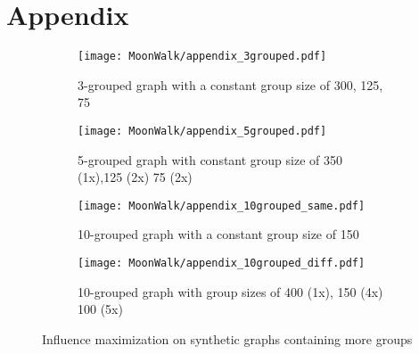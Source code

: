 \section{Appendix}

\begin{figure}[H]
  \begin{subfigure}[H]{0.475\textwidth}
    \texttt{[image: MoonWalk/appendix\_3grouped.pdf]}
    \caption{3-grouped graph with a constant group size of 300, 125, 75}
    \label{fig:7a}
  \end{subfigure}\hfill
  \begin{subfigure}[H]{0.475\textwidth}
    \texttt{[image: MoonWalk/appendix\_5grouped.pdf]}
    \caption{5-grouped graph with constant group size of 350 (1x),125 (2x) 75 (2x)}
    \label{fig:7b}
  \end{subfigure}\hfill
  \begin{subfigure}[H]{0.475\textwidth}
    \texttt{[image: MoonWalk/appendix\_10grouped\_same.pdf]}
    \caption{10-grouped graph with a constant group size of 150}
    \label{fig:7c}
  \end{subfigure}\hfill
  \begin{subfigure}[H]{0.475\textwidth}
    \texttt{[image: MoonWalk/appendix\_10grouped\_diff.pdf]}
    \caption{10-grouped graph with group sizes of 400 (1x), 150 (4x) 100 (5x)}
    \label{fig:7d}
  \end{subfigure}
  \caption{Influence maximization on synthetic graphs containing more groups} 
  \label{fig:7}
\end{figure}